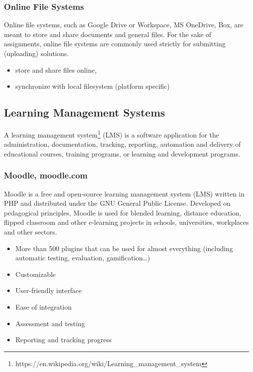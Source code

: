 \subsubsection{Online File Systems}

{Online file systems, such as Google Drive or Workspace, MS OneDrive, Box, are meant to store and share documents and general files. For the sake of assignments, online file systems are commonly used strictly for submitting (uploading) solutions.}

\begin{itemize}
\item
  {store and share files online,}
\item
  {synchronize with local filesystem (platform specific)}
\end{itemize}

\subsection{Learning Management Systems} \label{ssec:lms}

{A learning management system\footnote{https://en.wikipedia.org/wiki/Learning\_management\_system} (LMS) is a software application for the administration, documentation, tracking, reporting, automation and delivery of educational courses, training programs, or learning and development programs.}

\subsubsection{Moodle, moodle.com}

{Moodle is a free and open-source learning management system (LMS) written in PHP and distributed under the GNU General Public License. Developed on pedagogical principles, Moodle is used for blended learning, distance education, flipped classroom and other e-learning projects in schools, universities, workplaces and other sectors.}

\begin{itemize}
\item
  {More than 500 plugins that can be used for almost everything (including automatic testing, evaluation, gamification\ldots{})}
\item
  {Customizable}
\item
  {User-friendly interface}
\item
  {Ease of integration}
\item
  {Assessment and testing}
\item
  {Reporting and tracking progress}
\end{itemize}

